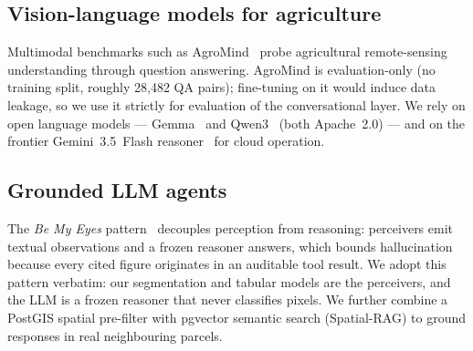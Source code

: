 \subsection{Vision-language models for agriculture}
Multimodal benchmarks such as AgroMind~\cite{ruan2025agromind} probe
agricultural remote-sensing understanding through question answering.
AgroMind is evaluation-only (no training split, roughly 28{,}482 QA
pairs); fine-tuning on it would induce data leakage, so we use it
strictly for evaluation of the conversational layer. We rely on open
language models --- Gemma~\cite{team2024gemma} and
Qwen3~\cite{yang2025qwen3} (both Apache~2.0) --- and on the frontier
Gemini~3.5~Flash reasoner~\cite{google2025gemini25} for cloud operation.

\subsection{Grounded LLM agents}
The \emph{Be My Eyes} pattern~\cite{huang2025bemyeyes} decouples
perception from reasoning: perceivers emit textual observations and a
frozen reasoner answers, which bounds hallucination because every cited
figure originates in an auditable tool result. We adopt this pattern
verbatim: our segmentation and tabular models are the perceivers, and
the LLM is a frozen reasoner that never classifies pixels. We further
combine a PostGIS spatial pre-filter with pgvector semantic search
(Spatial-RAG) to ground responses in real neighbouring parcels.
